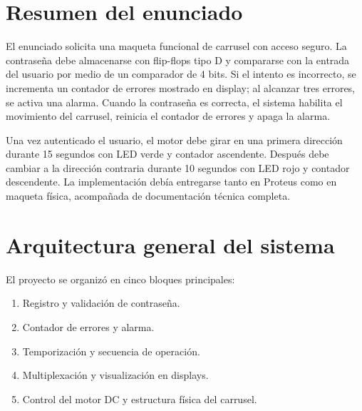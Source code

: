 \documentclass[12pt,a4paper]{article}
\begin{document}
\section{Resumen del enunciado}
El enunciado solicita una maqueta funcional de carrusel con acceso seguro. La contraseña debe almacenarse con flip-flops tipo D y compararse con la entrada del usuario por medio de un comparador de 4 bits. Si el intento es incorrecto, se incrementa un contador de errores mostrado en display; al alcanzar tres errores, se activa una alarma. Cuando la contraseña es correcta, el sistema habilita el movimiento del carrusel, reinicia el contador de errores y apaga la alarma.

Una vez autenticado el usuario, el motor debe girar en una primera dirección durante 15 segundos con LED verde y contador ascendente. Después debe cambiar a la dirección contraria durante 10 segundos con LED rojo y contador descendente. La implementación debía entregarse tanto en Proteus como en maqueta física, acompañada de documentación técnica completa.

\section{Arquitectura general del sistema}
El proyecto se organizó en cinco bloques principales:
\begin{enumerate}
    \item Registro y validación de contraseña.
    \item Contador de errores y alarma.
    \item Temporización y secuencia de operación.
    \item Multiplexación y visualización en displays.
    \item Control del motor DC y estructura física del carrusel.
\end{enumerate}
\end{document}
